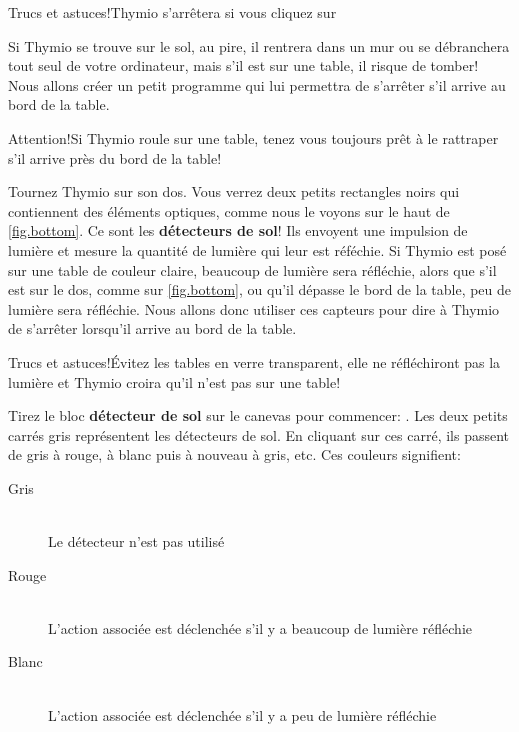 \begin{bclogo}[couleur = blue!30, arrondi = 0.1, logo = \bcinfo, ombre = true]{Trucs et astuces!}Thymio s'arrêtera si vous cliquez sur 
\end{bclogo}


Si Thymio se trouve sur le sol, au pire, il rentrera dans un mur ou se débranchera tout seul de votre ordinateur, mais s'il est sur une table, il risque de tomber! Nous allons créer un petit programme qui lui permettra de s'arrêter s'il arrive au bord de la table.

\begin{bclogo}[couleur = green!30, arrondi = 0.1, logo = \bctakecare, ombre = true]{Attention!}Si Thymio roule sur une table, tenez vous toujours prêt à le rattraper s'il arrive près du bord de la table!
\end{bclogo}

Tournez Thymio sur son dos. Vous verrez deux petits rectangles noirs qui contiennent des éléments optiques, comme nous le voyons sur le haut de \cref{fig.bottom}. Ce sont les \textbf{détecteurs de sol}! Ils envoyent une impulsion de lumière et mesure la quantité de lumière qui leur est réféchie. Si Thymio est posé sur une table de couleur claire, beaucoup de lumière sera réfléchie, alors que s'il est sur le dos, comme sur \cref{fig.bottom}, ou qu'il dépasse le bord de la table, peu de lumière sera réfléchie. Nous allons donc utiliser ces capteurs pour dire à Thymio de s'arrêter lorsqu'il arrive au bord de la table.

\begin{bclogo}[couleur = blue!30, arrondi = 0.1, logo = \bcinfo, ombre = true]{Trucs et astuces!}Évitez les tables en verre transparent, elle ne réfléchiront pas la lumière et Thymio croira qu'il n'est pas sur une table!
\end{bclogo}

Tirez le bloc \textbf{détecteur de sol} sur le canevas pour commencer: . Les deux petits carrés gris représentent les détecteurs de sol. En cliquant sur ces carré, ils passent de gris à rouge, à blanc puis à nouveau à gris, etc. Ces couleurs signifient:

\begin{description}
	\item[Gris] \hfill \\
		Le détecteur n'est pas utilisé
	\item[Rouge] \hfill \\
		L'action associée est déclenchée s'il y a beaucoup de lumière réfléchie
	\item[Blanc] \hfill \\
		L'action associée est déclenchée s'il y a peu de lumière réfléchie
\end{description}

